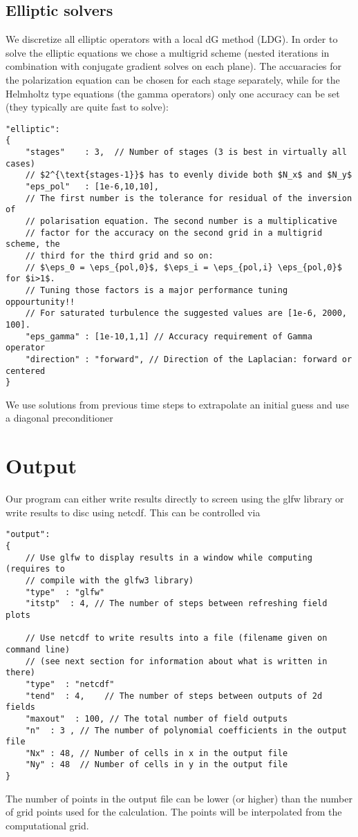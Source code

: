 \subsection{Elliptic solvers}
We discretize all elliptic operators with a local dG method (LDG).  In order to
solve the elliptic equations we chose a multigrid scheme (nested iterations in
combination with conjugate gradient solves on each plane). The accuaracies for
the polarization equation can be chosen for each stage separately, while for
the Helmholtz type equations (the gamma operators) only
one accuracy can be set (they typically are quite fast to solve):
\begin{verbatim}
"elliptic":
{
    "stages"    : 3,  // Number of stages (3 is best in virtually all cases)
    // $2^{\text{stages-1}}$ has to evenly divide both $N_x$ and $N_y$
    "eps_pol"   : [1e-6,10,10],
    // The first number is the tolerance for residual of the inversion of
    // polarisation equation. The second number is a multiplicative
    // factor for the accuracy on the second grid in a multigrid scheme, the
    // third for the third grid and so on:
    // $\eps_0 = \eps_{pol,0}$, $\eps_i = \eps_{pol,i} \eps_{pol,0}$  for $i>1$.
    // Tuning those factors is a major performance tuning oppourtunity!!
    // For saturated turbulence the suggested values are [1e-6, 2000, 100].
    "eps_gamma" : [1e-10,1,1] // Accuracy requirement of Gamma operator
    "direction" : "forward", // Direction of the Laplacian: forward or centered
}
\end{verbatim}
\begin{tcolorbox}[title=Note]
    We use solutions from previous time steps to extrapolate an initial guess
    and use a diagonal preconditioner
\end{tcolorbox}
\section{Output}
Our program can either write results directly to screen using the glfw library
or write results to disc using netcdf.
This can be controlled via
\begin{verbatim}
"output":
{
    // Use glfw to display results in a window while computing (requires to
    // compile with the glfw3 library)
    "type"  : "glfw"
    "itstp"  : 4, // The number of steps between refreshing field plots

    // Use netcdf to write results into a file (filename given on command line)
    // (see next section for information about what is written in there)
    "type"  : "netcdf"
    "tend"  : 4,    // The number of steps between outputs of 2d fields
    "maxout"  : 100, // The total number of field outputs
    "n"  : 3 , // The number of polynomial coefficients in the output file
    "Nx" : 48, // Number of cells in x in the output file
    "Ny" : 48  // Number of cells in y in the output file
}
\end{verbatim}
The number of points in the output file can be lower (or higher) than the number of
grid points used for the calculation. The points will be interpolated from the
computational grid.
